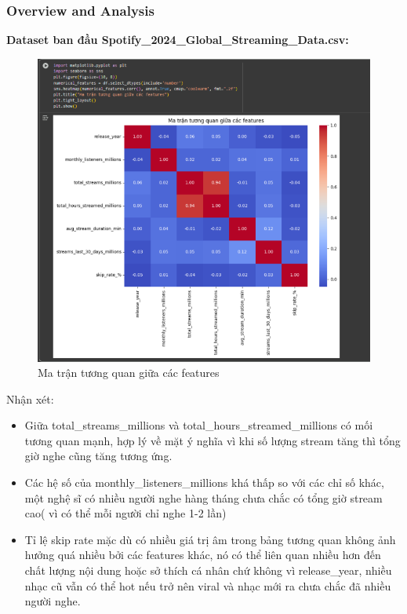 \subsubsection{Overview and Analysis}
\textbf{Dataset ban đầu Spotify\_2024\_Global\_Streaming\_Data.csv:}
\begin{figure}[H]
    \centering
    \includegraphics[width=1\linewidth]{../graphics/data2/3.png}
    \caption{Ma trận tương quan giữa các features}
    \label{fig:placeholder}
\end{figure}
Nhận xét:
\begin{itemize}
    \item Giữa total\_streams\_millions và total\_hours\_streamed\_millions có mối tương quan mạnh, hợp lý về mặt ý nghĩa vì khi số lượng stream tăng thì tổng giờ nghe cũng tăng tương ứng.
 \item Các hệ số của monthly\_listeners\_millions khá thấp so với các chỉ số khác, một nghệ sĩ có nhiều người nghe hàng tháng chưa chắc có tổng giờ stream cao( vì có thể mỗi người chỉ nghe 1-2 lần)
\item Tỉ lệ skip rate mặc dù có nhiều giá trị âm trong bảng tương quan không ảnh hưởng quá nhiều bởi các features khác, nó có thể liên quan nhiều hơn đến chất lượng nội dung hoặc sở thích cá nhân chứ không vì release\_year, nhiều nhạc cũ vẫn có thể hot nếu trở nên viral và nhạc mới ra chưa chắc đã nhiều người nghe.
\end{itemize}
